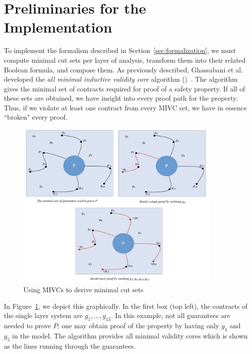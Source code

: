 \section{Preliminaries for the Implementation}
\label{sec:prelim}

%
To implement the formalism described in Section~\ref{sec:formalization}, we must compute minimal cut sets per layer of analysis, transform them into their related Boolean formula, and compose them. As previously described, Ghassabani et al. developed the \textit{all minimal inductive validity core} algorithm (\aivcalg)~\cite{GhassabaniGW16,Ghassabani2017EfficientGO,bendik2018online}. The \aivcalg algorithm gives the minimal set of contracts required for proof of a safety property. If all of these sets are obtained, we have insight into every proof path for the property. Thus, if we violate at least one contract from every MIVC set, we have in essence ``broken" every proof. 
\begin{figure}[h!]
	\begin{center}
		\includegraphics[width=0.9\textwidth]{images/mivcBreaking.png}
	\end{center}
	\caption{Using MIVCs to derive minimal cut sets}
	\label{fig:mivcBreaking}
\end{figure}

In Figure~\ref{fig:mivcBreaking}, we depict this graphically. In the first box (top left), the contracts of the single layer system are $g_1, \dots, g_{13}$. In this example, not all guarantees are needed to prove $P$; one may obtain proof of the property by having only $g_4$ and $g_5$ in the model. The \aivcalg algorithm provides all minimal validity cores which is shown as the lines running through the guarantees. 

